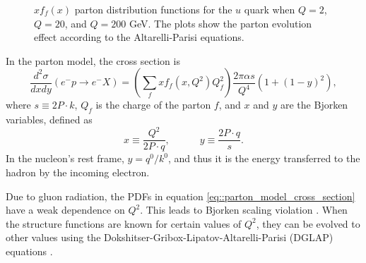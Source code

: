     \begin{figure}[b!] %
        \centering{}
        \caption[$Q^2$ dependence of $x$ PDF for the $u$ quark.]{$xf_f(x)$ parton distribution functions for the $u$ quark when $Q = 2$, $Q = 20$, and $Q = 200$ GeV.
        The plots show the parton evolution effect according to the Altarelli-Parisi equations.}
        \label{fig::q2dependenceu}
    \end{figure}

    In the parton model, the cross section is
    \begin{equation}
        \label{eq::parton_model_cross_section}
        \frac{d^2\sigma}{dxdy} \left( e^-p \rightarrow e^-X \right) =
                \left( \sum_f xf_f \left( x, Q^2 \right) Q_f^2 \right)
                \frac{2\pi\alpha s}{Q^4} \left( 1 + \left( 1 - y \right)^2 \right),
    \end{equation}
    where $s \equiv 2P\cdot k$, $Q_f$ is the charge of the parton $f$, and $x$ and $y$ are the Bjorken variables, defined as
    \begin{equation*}
        x \equiv \frac{Q^2}{2P\cdot q}, \hspace{36pt} y \equiv \frac{2 P\cdot q}{s}.
    \end{equation*}
    In the nucleon's rest frame, $y = q^0/k^0$, and thus it is the energy transferred to the hadron by the incoming electron.

    Due to gluon radiation, the PDFs in equation \eqref{eq::parton_model_cross_section} have a weak dependence on $Q^2$.
    This leads to Bjorken scaling violation \cite{halzen1991}.
    When the structure functions are known for certain values of $Q^2$, they can be evolved to other values using the Dokshitser-Gribox-Lipatov-Altarelli-Parisi (DGLAP) equations \cite{dokshitzer1991}.

